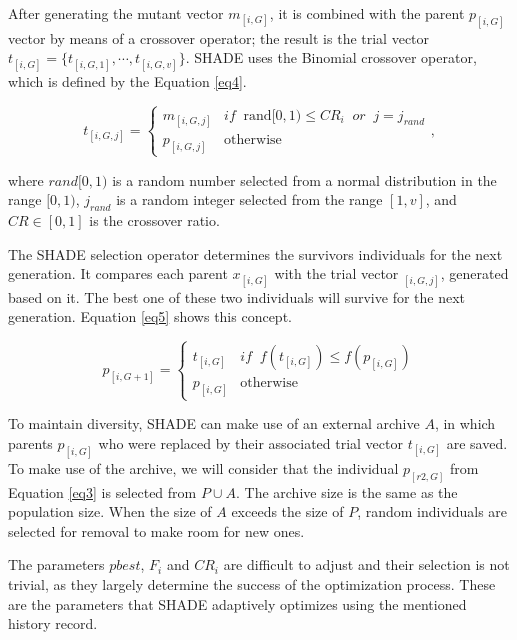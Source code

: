 \documentclass[review]{elsarticle}
\begin{document}
After generating the mutant vector $m_{[i,G]}$, it is combined with the parent $p_{[i,G]}$ vector by means of a crossover operator; the result is the trial vector $t_{[i,G]} = \{t_{[i,G,1]}, \cdots, t_{[i,G,v]}\}$. SHADE uses the Binomial crossover operator, which is defined by the Equation \eqref{eq4}.

\begin{equation}
t_{[i,G,j]} = \left\{ \begin{array}{lc}
m_{[i,G,j]} &   if \;\; \text{rand}[0,1) \le CR_i \;\; or \;\;j = j_{rand} \\
p_{[i,G,j]} &  \text{otherwise}
\end{array}
\right.,
\label{eq4}
\end{equation}

\noindent where $rand[0,1)$ is a random number selected from a normal distribution in the range $[0,1)$, $j_{rand}$ is a random integer selected from the range $[1,v]$, and $CR \in [0,1]$ is the crossover ratio.

The SHADE selection operator determines the survivors individuals for the next generation. It compares each parent $x_{[i,G]}$ with the trial vector $_{[i,G,j]}$, generated based on it. The best one of these two individuals will survive for the next generation. Equation \eqref{eq5} shows this concept.

\begin{equation}
p_{[i,G + 1]} = \left\{ \begin{array}{lc}
t_{[i,G]} &   if \;\; f(t_{[i,G]}) \le f(p_{[i,G]}) \\
p_{[i,G]} &  \text{otherwise}
\end{array}
\right.
\label{eq5}
\end{equation}

To maintain diversity, SHADE can make use of an external archive $A$, in which parents $p_{[i,G]}$ who were replaced by their associated trial vector $t_{[i,G]}$ are saved. To make use of the archive, we will consider that the individual $p_{[r2,G]}$ from Equation \eqref{eq3} is selected from $P \cup A$. The archive size is the same as the population size. When the size of $A$ exceeds the size of $P$, random individuals are selected for removal to make room for new ones.

The parameters $pbest$, $F_i$ and $CR_i$ are difficult to adjust and their selection is not trivial, as they largely determine the success of the optimization process. These are the parameters that SHADE adaptively optimizes using the mentioned history record.
\end{document}

